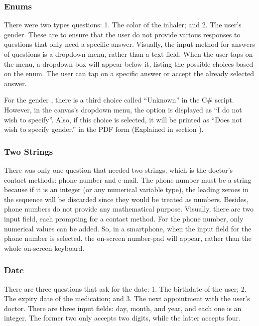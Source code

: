 \subsubsection*{Enums}
There were two types  questions: 1. The color of the inhaler; and 2. The user’s gender. These are to ensure that the user do not provide various responses to questions that only need a specific answer. Visually, the input method for answers of  questions is a dropdown menu, rather than a text field. When the user taps on the menu, a dropdown box will appear below it, listing the possible choices based on the enum. The user can tap on a specific answer or accept the already selected answer.

For the gender , there is a third choice called “{\codefont Unknown}” in the C\# script. However, in the canvas's dropdown menu, the option is displayed as “I do not wish to specify”. Also, if this choice is selected, it will be printed as “Does not wish to specify gender.” in the PDF form (Explained in section \textbf{}).

\subsubsection*{Two Strings}
There was only one question that needed two strings, which is the doctor’s contact methods: phone number and e-mail. The phone number must be a string because if it is an integer (or any numerical variable type), the leading zeroes in the sequence will be discarded since they would be treated as numbers. Besides, phone numbers do not provide any mathematical purpose. Visually, there are two input field, each prompting for a contact method. For the phone number, only numerical values can be added. So, in a smartphone, when the input field for the phone number is selected, the on-screen number-pad will appear, rather than the whole on-screen keyboard.

\subsubsection*{Date}
There are three questions that ask for the date: 1. The birthdate of the user; 2. The expiry date of the medication; and 3. The next appointment with the user’s doctor. There are three input fields: day, month, and year, and each one is an integer. The former two only accepts two digits, while the latter accepts four.


